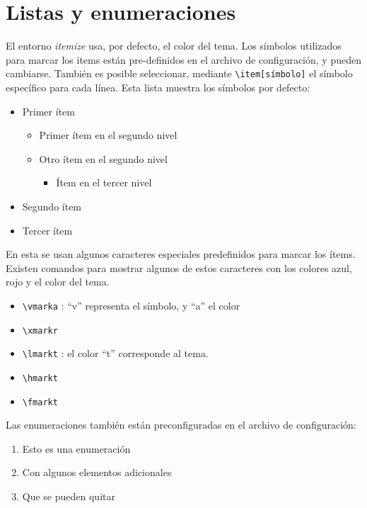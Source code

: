 \section{Listas y enumeraciones}

El entorno \textit{itemize} usa, por defecto, el color del tema. Los símbolos utilizados para marcar los items están pre-definidos en el archivo de configuración, y pueden cambiarse. También es posible seleccionar, mediante \verb+\item[símbolo]+ el símbolo específico para cada línea. Esta lista muestra los símbolos por defecto:

\begin{itemize}
\item Primer ítem
\begin{itemize}
\item Primer ítem en el segundo nivel
\item Otro ítem en el segundo nivel
\begin{itemize}
\item Ítem en el tercer nivel
\end{itemize}
\end{itemize}
\item Segundo ítem
\item Tercer ítem \\
\end{itemize}

En esta se usan algunos caracteres especiales predefinidos para marcar los ítems. Existen comandos para mostrar algunos de estos caracteres con los colores azul, rojo y el color del tema.

\begin{itemize}
\item[\vmarka] \verb+\vmarka+ : ``v'' representa el símbolo, y ``a'' el color
\item[\xmarkr] \verb+\xmarkr+
\item[\lmarkt] \verb+\lmarkt+ : el color ``t'' corresponde al tema.
\item[\hmarkt] \verb+\hmarkt+ 
\item[\fmarkt] \verb+\fmarkt+ \\
\end{itemize}

Las enumeraciones también están preconfiguradas en el archivo de configuración:

\begin{enumerate}
\item Esto es una enumeración
\item Con algunos elementos adicionales
\item Que se pueden quitar
\end{enumerate}

